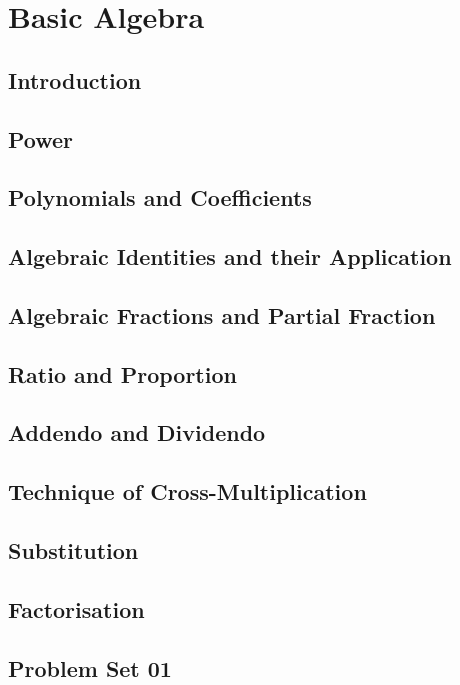 \chapter{Basic Algebra}


\section{Introduction}
\section{Power}
\section{Polynomials and Coefficients}
\section{Algebraic Identities and their Application}
\section{Algebraic Fractions and Partial Fraction}
\section{Ratio and Proportion}
\section{Addendo and Dividendo}
\section{Technique of Cross-Multiplication}
\section{Substitution}
\section{Factorisation}

\newpage
\section{Problem Set 01}
